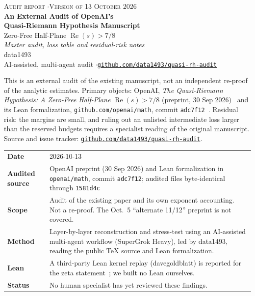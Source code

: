 \documentclass[11pt]{article}
\renewcommand{\arraystretch}{1.35}
\newcommand{\repo}{\href{https://github.com/data1493/quasi-rh-audit}{\texttt{github.com/data1493/quasi-rh-audit}}}
\begin{document}
\thispagestyle{first}
\begin{center}
{\small\scshape Audit report \quad$\cdot$\quad Version of 13 October 2026}\\[1.4em]
{\LARGE\bfseries An External Audit of OpenAI's\\[0.3em] Quasi-Riemann Hypothesis Manuscript}\\[0.7em]
{\large Zero-Free Half-Plane $\operatorname{Re}(s) > 7/8$}\\[0.6em]
{\normalsize\itshape Master audit, loss table and residual-risk notes}\\[1.3em]
{\large data1493}\\[0.2em]
{\small AI-assisted, multi-agent audit \quad$\cdot$\quad \repo}
\end{center}
\vspace{0.6em}
\begin{tcolorbox}[colback=boxbg,colframe=acc,boxrule=0.6pt,arc=2pt,left=10pt,right=10pt,top=8pt,bottom=8pt,title=\textbf{Abstract},fonttitle=\small,colbacktitle=acc]
This is an external audit of the existing manuscript, not an independent re-proof of the analytic estimates. Primary objects: OpenAI, \emph{The Quasi-Riemann Hypothesis: A Zero-Free Half-Plane $\operatorname{Re}(s)>7/8$} (preprint, 30 Sep 2026)~\cite{openai} and its Lean formalization, \texttt{github.com/openai/math}, commit \texttt{adc7f12}~\cite{lean}. Residual risk: the margins are small, and ruling out an unlisted intermediate loss larger than the reserved budgets requires a specialist reading of the original manuscript. Source and issue tracker: \repo.
\end{tcolorbox}

\begin{tcolorbox}[colback=white,colframe=acc!60,boxrule=0.5pt,arc=2pt,left=10pt,right=10pt,top=6pt,bottom=6pt,title=\textbf{At a glance},fonttitle=\small,colbacktitle=acc!60]
\renewcommand{\arraystretch}{1.55}
\begin{tabularx}{\linewidth}{@{}>{\bfseries\small}p{2.6cm}Y@{}}
Date & 2026-10-13\\
Audited source & OpenAI preprint (30 Sep 2026) and Lean formalization in \texttt{openai/math}, commit \texttt{adc7f12}; audited files byte-identical through \texttt{1581d4c}\\
Scope & Audit of the existing paper and its own exponent accounting. Not a re-proof. The Oct.~5 ``alternate 11/12'' preprint is not covered.\\
Method & Layer-by-layer reconstruction and stress-test using an AI-assisted multi-agent workflow (SuperGrok Heavy), led by data1493, reading the public TeX source and Lean formalization.\\
Lean & A third-party Lean kernel replay (davegoldblatt) is reported for the zeta statement~\cite{replay}; we built no Lean ourselves.\\
Status & No human specialist has yet reviewed these findings.\\
\end{tabularx}
\end{tcolorbox}
\end{document}
